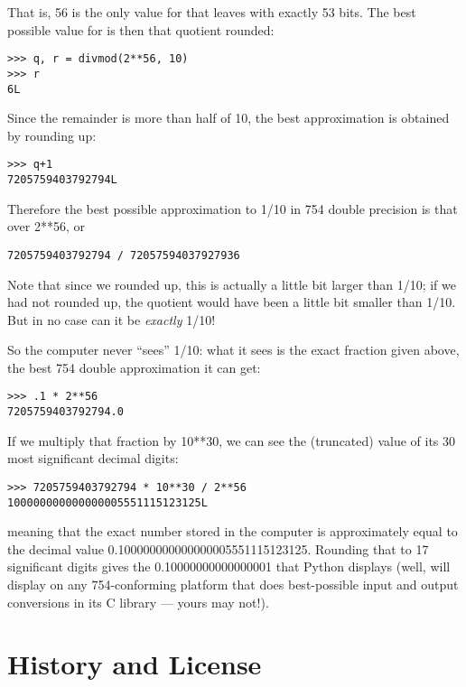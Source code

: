 \documentclass{manual}
\begin{document}
That is, 56 is the only value for  that leaves  with
exactly 53 bits.  The best possible value for  is then that
quotient rounded:

\begin{verbatim}
>>> q, r = divmod(2**56, 10)
>>> r
6L
\end{verbatim}

Since the remainder is more than half of 10, the best approximation is
obtained by rounding up:

\begin{verbatim}
>>> q+1
7205759403792794L
\end{verbatim}

Therefore the best possible approximation to 1/10 in 754 double
precision is that over 2**56, or

\begin{verbatim}
7205759403792794 / 72057594037927936
\end{verbatim}

Note that since we rounded up, this is actually a little bit larger than
1/10; if we had not rounded up, the quotient would have been a little
bit smaller than 1/10.  But in no case can it be \emph{exactly} 1/10!

So the computer never ``sees'' 1/10:  what it sees is the exact
fraction given above, the best 754 double approximation it can get:

\begin{verbatim}
>>> .1 * 2**56
7205759403792794.0
\end{verbatim}

If we multiply that fraction by 10**30, we can see the (truncated)
value of its 30 most significant decimal digits:

\begin{verbatim}
>>> 7205759403792794 * 10**30 / 2**56
100000000000000005551115123125L
\end{verbatim}

meaning that the exact number stored in the computer is approximately
equal to the decimal value 0.100000000000000005551115123125.  Rounding
that to 17 significant digits gives the 0.10000000000000001 that Python
displays (well, will display on any 754-conforming platform that does
best-possible input and output conversions in its C library --- yours may
not!).

\chapter{History and License}





\end{document}

